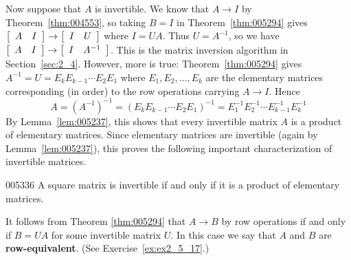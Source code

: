 Now suppose that $A$ is invertible. We know that $A \to I$ by Theorem~\ref{thm:004553}, so taking $B = I$ in Theorem~\ref{thm:005294} gives $\left[ \begin{array}{cc}
A & I
\end{array} \right] \rightarrow \left[ \begin{array}{cc}
I & U
\end{array} \right]$ where $I = UA$. Thus $U = A^{-1}$, so we have $\left[ \begin{array}{cc}
A & I
\end{array} \right] \rightarrow \left[ \begin{array}{cc}
I & A^{-1}
\end{array} \right]$. This is the matrix inversion algorithm in Section~\ref{sec:2_4}. However, more is true: Theorem~\ref{thm:005294} gives $A^{-1} = U = E_{k}E_{k-1} \cdots E_{2}E_{1}$ where $E_{1}, E_{2}, \dots, E_{k}$ are the elementary matrices corresponding (in order) to the row operations carrying $A \to I$. Hence
\begin{equation}
A = \left(A^{-1}\right)^{-1} = \left(E_{k}E_{k-1} \cdots E_{2}E_{1}\right)^{-1} = E_{1}^{-1}E_{2}^{-1} \cdots E_{k-1}^{-1}E_{k}^{-1}
\end{equation}
By Lemma~\ref{lem:005237}, this shows that every invertible matrix $A$ is a product of elementary matrices. Since elementary matrices are invertible (again by Lemma~\ref{lem:005237}), this proves the following important characterization of invertible matrices.

\begin{theorem}{}{005336}
A square matrix is invertible if and only if it is a product of elementary matrices.
\end{theorem}

It follows from Theorem \ref{thm:005294} that $A \to B$ by row operations if and only if $B = UA$ for some invertible matrix $U$. In this case we say that $A$ and $B$ are \textbf{row-equivalent}. (See Exercise~\ref{ex:ex2_5_17}.)


